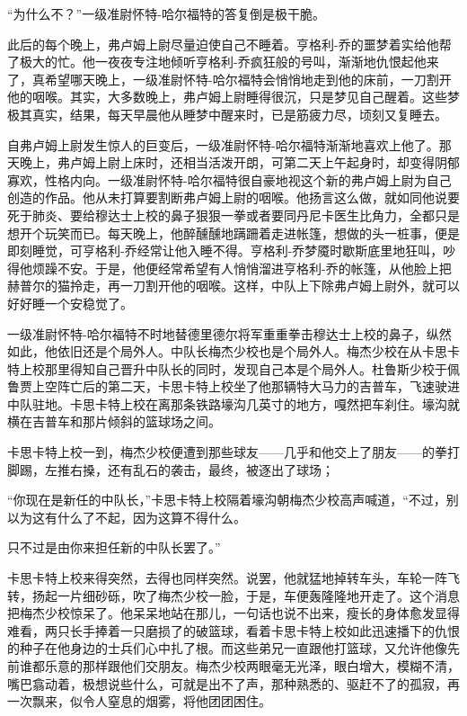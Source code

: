     “为什么不？”一级准尉怀特-哈尔福特的答复倒是极干脆。

    此后的每个晚上，弗卢姆上尉尽量迫使自己不睡着。亨格利-乔的噩梦着实给他帮了极大的忙。他一夜夜专注地倾听亨格利-乔疯狂般的号叫，渐渐地仇恨起他来了，真希望哪天晚上，一级准尉怀特-哈尔福特会悄悄地走到他的床前，一刀割开他的咽喉。其实，大多数晚上，弗卢姆上尉睡得很沉，只是梦见自己醒着。这些梦极其真实，结果，每天早晨他从睡梦中醒来时，已是筋疲力尽，顷刻又复睡去。

    自弗卢姆上尉发生惊人的巨变后，一级准尉怀特-哈尔福特渐渐地喜欢上他了。那天晚上，弗卢姆上尉上床时，还相当活泼开朗，可第二天上午起身时，却变得阴郁寡欢，性格内向。一级准尉怀特-哈尔福特很自豪地视这个新的弗卢姆上尉为自己创造的作品。他从未打算要割断弗卢姆上尉的咽喉。他扬言这么做，就如同他说要死于肺炎、要给穆达士上校的鼻子狠狠一拳或者要同丹尼卡医生比角力，全都只是想开个玩笑而已。每天晚上，他醉醺醺地蹒跚着走进帐篷，想做的头一桩事，便是即刻睡觉，可亨格利-乔经常让他入睡不得。亨格利-乔梦魇时歇斯底里地狂叫，吵得他烦躁不安。于是，他便经常希望有人悄悄溜进亨格利-乔的帐篷，从他脸上把赫普尔的猫拎走，再一刀割开他的咽喉。这样，中队上下除弗卢姆上尉外，就可以好好睡一个安稳觉了。
 


    一级准尉怀特-哈尔福特不时地替德里德尔将军重重拳击穆达士上校的鼻子，纵然如此，他依旧还是个局外人。中队长梅杰少校也是个局外人。梅杰少校在从卡思卡特上校那里得知自己晋升中队长的同时，发现自己本是个局外人。杜鲁斯少校于佩鲁贾上空阵亡后的第二天，卡思卡特上校坐了他那辆特大马力的吉普车，飞速驶进中队驻地。卡思卡特上校在离那条铁路壕沟几英寸的地方，嘎然把车刹住。壕沟就横在吉普车和那片倾斜的篮球场之间。

    卡思卡特上校一到，梅杰少校便遭到那些球友——几乎和他交上了朋友——的拳打脚踢，左推右搡，还有乱石的袭击，最终，被逐出了球场；

    “你现在是新任的中队长，”卡思卡特上校隔着壕沟朝梅杰少校高声喊道，“不过，别以为这有什么了不起，因为这算不得什么。

    只不过是由你来担任新的中队长罢了。”

    卡思卡特上校来得突然，去得也同样突然。说罢，他就猛地掉转车头，车轮一阵飞转，扬起一片细砂砾，吹了梅杰少校一脸，于是，车便轰隆隆地开走了。这个消息把梅杰少校惊呆了。他呆呆地站在那儿，一句话也说不出来，瘦长的身体愈发显得难看，两只长手捧着一只磨损了的破篮球，看着卡思卡特上校如此迅速播下的仇恨的种子在他身边的士兵们心中扎了根。而这些弟兄一直跟他打篮球，又允许他像先前谁都乐意的那样跟他们交朋友。梅杰少校两眼毫无光泽，眼白增大，模糊不清，嘴巴翕动着，极想说些什么，可就是出不了声，那种熟悉的、驱赶不了的孤寂，再一次飘来，似令人窒息的烟雾，将他团团困住。

